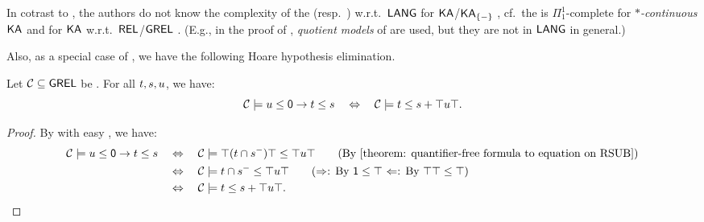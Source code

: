 \begin{remark}\label{remark: open}
    In cotrast to ,
    the authors do not know the complexity of the  (resp.\ ) w.r.t.\ $\mathsf{LANG}$ for $\mathsf{KA}$/$\mathsf{KA}_{\{-\}}$ ,
    cf.\ the  is $\Pi^{1}_{1}$-complete for \emph{$*$-continuous $\mathsf{KA}$} \cite{kozenComplexityReasoningKleene2002} and for $\mathsf{KA}$ w.r.t.\ $\mathsf{REL}$/$\mathsf{GREL}$ \cite{hardinComplexityHornTheory2003}.
    (E.g., in the proof of \cite{kozenComplexityReasoningKleene2002}, \emph{quotient models} of  are used, but they are not in $\mathsf{LANG}$ in general.)
    \lipicsEnd
\end{remark}

Also, as a special case of , we have the following Hoare hypothesis elimination.
\begin{corollary}\label{corollary: ORD lr Hoare}
    Let $\algclass \subseteq \GREL$ be .
    For all  $\term[1], \term[2], \term[3]$, we have:
    \[\algclass \models \term[3] \le \emp \to \term[1] \le \term[2] \quad\Leftrightarrow\quad \algclass \models \term[1] \le \term[2] \union \top \term[3] \top.\]
\end{corollary}
\begin{proof}
    By  with easy , we have:
    \begin{align*}
        \algclass \models \term[3] \le \emp \to \term[1] \le \term[2]
                                                                      & \quad\Leftrightarrow\quad \algclass \models \top (\term[1] \cap \term[2]^{-}) \top \le \top \term[3] \top \tag{By \Cref{theorem: quantifier-free formula to equation on RSUB}}                        \\
                                                                      & \quad\Leftrightarrow\quad \algclass \models \term[1] \cap \term[2]^{-} \le \top \term[3] \top \tag{$\Rightarrow$:
                By $\id \le \top$
                $\Leftarrow$:
                By $\top \top \le \top$}                                                                                                                                                 \\
                                                                      & \quad\Leftrightarrow\quad \algclass \models \term[1] \le \term[2] \union \top \term[3] \top.  \tag*{\qedhere}
    \end{align*}
\end{proof}

